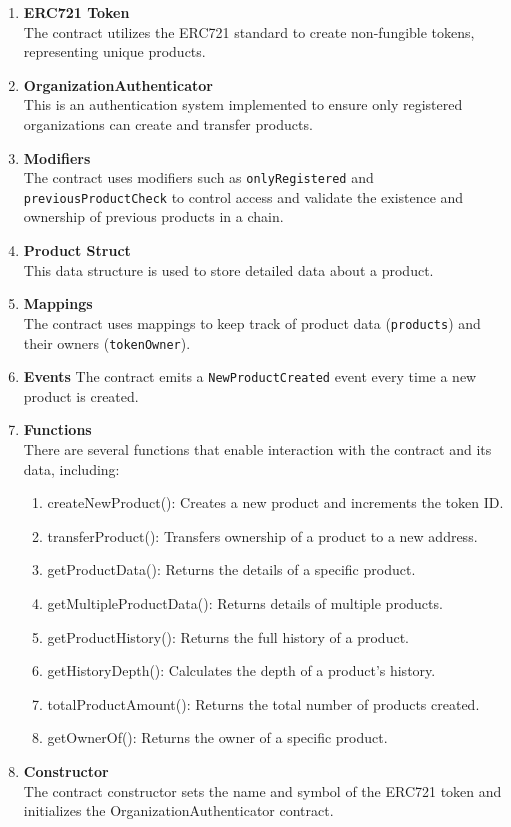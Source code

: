 \documentclass[oneside,a4paper,12pt, colorinlistoftodos]{article} %
\begin{document}
\begin{enumerate}
    \item \textbf{ERC721 Token} \\
    The contract utilizes the ERC721 standard to create non-fungible tokens, representing unique products.
    \item \textbf{OrganizationAuthenticator}\\
    This is an authentication system implemented to ensure only registered organizations can create and transfer products.
    \item \textbf{Modifiers} \\
    The contract uses modifiers such as \texttt{onlyRegistered} and \texttt{previousProductCheck} to control access and validate the existence and ownership of previous products in a chain.
    \item \textbf{Product Struct} \\
    This data structure is used to store detailed data about a product.
    \item \textbf{Mappings} \\
    The contract uses mappings to keep track of product data (\texttt{\textunderscore products}) and their owners (\texttt{\textunderscore tokenOwner}).
    \item \textbf{Events} The contract emits a \texttt{NewProductCreated} event every time a new product is created.
    \item \textbf{Functions} \\
    There are several functions that enable interaction with the contract and its data, including:
    \begin{enumerate}
        \item createNewProduct(): Creates a new product and increments the token ID.
        \item transferProduct(): Transfers ownership of a product to a new address.
        \item getProductData(): Returns the details of a specific product.
        \item getMultipleProductData(): Returns details of multiple products.
        \item getProductHistory(): Returns the full history of a product.
        \item getHistoryDepth(): Calculates the depth of a product's history.
        \item totalProductAmount(): Returns the total number of products created.
        \item getOwnerOf(): Returns the owner of a specific product.
    \end{enumerate}
    \item \textbf{Constructor} \\
    The contract constructor sets the name and symbol of the ERC721 token and initializes the OrganizationAuthenticator contract.
\end{enumerate}
\end{document}
